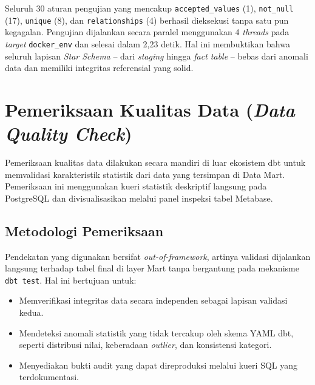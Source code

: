 Seluruh 30 aturan pengujian yang mencakup \texttt{accepted\_values} (1), \texttt{not\_null} (17), \texttt{unique} (8), dan \texttt{relationships} (4) berhasil dieksekusi tanpa satu pun kegagalan. Pengujian dijalankan secara paralel menggunakan 4 \textit{threads} pada \textit{target} \texttt{docker\_env} dan selesai dalam 2,23 detik. Hal ini membuktikan bahwa seluruh lapisan \textit{Star Schema} -- dari \textit{staging} hingga \textit{fact table} -- bebas dari anomali data dan memiliki integritas referensial yang solid.
 

\section{Pemeriksaan Kualitas Data (\textit{Data Quality Check})}

Pemeriksaan kualitas data dilakukan secara mandiri di luar ekosistem dbt untuk memvalidasi
karakteristik statistik dari data yang tersimpan di Data Mart. Pemeriksaan ini menggunakan
kueri statistik deskriptif langsung pada PostgreSQL dan divisualisasikan melalui panel
inspeksi tabel Metabase.

\subsection{Metodologi Pemeriksaan}

Pendekatan yang digunakan bersifat \textit{out-of-framework}, artinya validasi dijalankan
langsung terhadap tabel final di layer Mart tanpa bergantung pada mekanisme \texttt{dbt test}.
Hal ini bertujuan untuk:

\begin{itemize}
  \item Memverifikasi integritas data secara independen sebagai lapisan validasi kedua.
  \item Mendeteksi anomali statistik yang tidak tercakup oleh skema YAML dbt,
        seperti distribusi nilai, keberadaan \textit{outlier}, dan konsistensi kategori.
  \item Menyediakan bukti audit yang dapat direproduksi melalui kueri SQL yang terdokumentasi.
\end{itemize}

